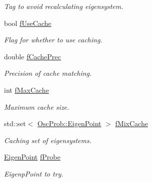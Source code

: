 \begin{DoxyCompactItemize}
\begin{DoxyCompactList}\small\item\em Tag to avoid recalculating eigensystem. \end{DoxyCompactList}\item 
bool \hyperlink{classOscProb_1_1PMNS__Base_ad28c12ef897b5555eda509ea55c99107}{f\+Use\+Cache}
\begin{DoxyCompactList}\small\item\em Flag for whether to use caching. \end{DoxyCompactList}\item 
double \hyperlink{classOscProb_1_1PMNS__Base_a0b4c41a27de281472453a1912cbc1e64}{f\+Cache\+Prec}
\begin{DoxyCompactList}\small\item\em Precision of cache matching. \end{DoxyCompactList}\item 
int \hyperlink{classOscProb_1_1PMNS__Base_a74c13356eafec2490d8c3c19759ba7f0}{f\+Max\+Cache}
\begin{DoxyCompactList}\small\item\em Maximum cache size. \end{DoxyCompactList}\item 
std\+::set$<$ \hyperlink{structOscProb_1_1EigenPoint}{Osc\+Prob\+::\+Eigen\+Point} $>$ \hyperlink{classOscProb_1_1PMNS__Base_a8159424f20197a3a7145fe3bf2c11176}{f\+Mix\+Cache}
\begin{DoxyCompactList}\small\item\em Caching set of eigensystems. \end{DoxyCompactList}\item 
\hyperlink{structOscProb_1_1EigenPoint}{Eigen\+Point} \hyperlink{classOscProb_1_1PMNS__Base_ab1fe4800ee3ae48df4fc942dce00e0d3}{f\+Probe}
\begin{DoxyCompactList}\small\item\em Eigenp\+Point to try. \end{DoxyCompactList}\end{DoxyCompactItemize}
